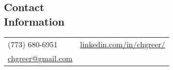 \documentclass[margin,line, 11pt]{res}
\begin{document}

\begin{resume}
\vspace*{-3mm}
\section{Contact\\Information}
\begin{tabular}{@{}p{4.9in}p{4in}}
  (773) 680-6951 & \href{https://www.linkedin.com/in/chgreer/}{linkedin.com/in/chgreer/} \\
  \href{mailto:chgreer@gmail.com}{chgreer@gmail.com}  \\
\end{tabular}

\vspace*{-2mm}


\end{resume}
\end{document}
